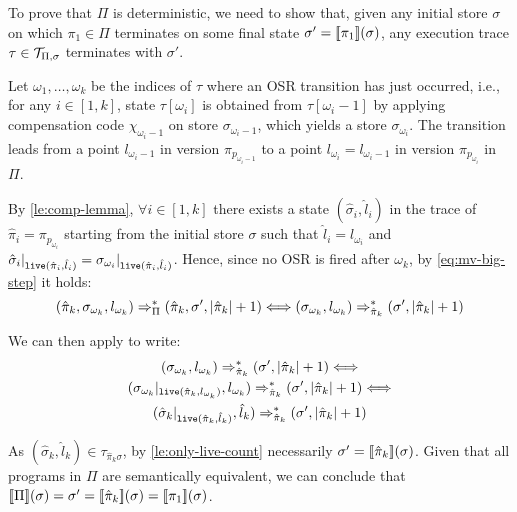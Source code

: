 \begin{myproof}
To prove that $\Pi$ is deterministic, we need to show that, given any initial store $\sigma$ on which $\pi_1\in\Pi$ terminates on some final state $\sigma'=[\![\pi_1]\!](\sigma)$, any execution trace $\tau\in{\cal T}_{\Pi,\sigma}$ terminates with $\sigma'$.

Let $\omega_1,\ldots,\omega_k$ be the indices of $\tau$ where an OSR transition has just occurred, i.e., for any $i\in[1,k]$, state $\tau[\omega_i]$ is obtained from $\tau[\omega_i-1]$ by applying compensation code $\chi_{\omega_i-1}$ on store $\sigma_{\omega_i-1}$, which yields a store $\sigma_{\omega_i}$. The transition leads from a point $l_{\omega_i-1}$ in version $\pi_{p_{\omega_i-1}}$ to a point $l_{\omega_i}=l_{\omega_i-1}$ in version $\pi_{p_{\omega_{i}}}$ in $\Pi$. 

By \mylemma\ref{le:comp-lemma}, $\forall i\in[1,k]$ there exists a state $(\hat{\sigma}_i,\hat{l}_i)$ in the trace of $\hat{\pi}_i=\pi_{p_{\omega_{i}}}$ starting from the initial store $\sigma$ such that $\hat{l}_i=l_{\omega_i}$ and $\hat{\sigma}_i\vert_{\text{${\tt live}$}(\hat{\pi}_i,\hat{l}_i)}=\sigma_{\omega_i}\vert_{\text{${\tt live}$}(\hat{\pi}_i,\hat{l}_i)}$. Hence, since no OSR is fired after $\omega_k$, by \myequation\ref{eq:mv-big-step} it holds: 
\begin{equation*}
(\hat{\pi}_k,\sigma_{\omega_{k}},l_{\omega_{k}})\Rightarrow^*_{\Pi}(\hat{\pi}_k,\sigma',|\hat{\pi}_k|+1) \Longleftrightarrow (\sigma_{\omega_{k}},l_{\omega_{k}})\Rightarrow^*_{\hat{\pi}_k}(\sigma',|\hat{\pi}_k|+1)
\end{equation*}

\noindent We can then apply  to write:
\begin{gather*}
(\sigma_{\omega_{k}},l_{\omega_{k}})\Rightarrow^*_{\hat{\pi}_k}(\sigma',|\hat{\pi}_k|+1) \Longleftrightarrow \\ 
(\sigma_{\omega_{k}}\vert_{\text{${\tt live}$}(\hat{\pi}_k,l_{\omega_{k}})},l_{\omega_{k}})\Rightarrow^*_{\hat{\pi}_k}(\sigma',|\hat{\pi}_k|+1) \Longleftrightarrow \\
(\hat{\sigma}_k\vert_{\text{${\tt live}$}(\hat{\pi}_k,\hat{l}_k)},\hat{l}_k)\Rightarrow^*_{\hat{\pi}_k}(\sigma',|\hat{\pi}_k|+1)
\end{gather*}

\noindent As $(\hat{\sigma}_k,\hat{l}_k)\in\tau_{\hat{\pi}_k\sigma}$, by \ref{le:only-live-count} necessarily $\sigma'=[\![\hat{\pi}_k]\!](\sigma)$. 
Given that all programs in $\Pi$ are semantically equivalent, we can conclude that $[\![\Pi]\!](\sigma)=\sigma'=[\![\hat{\pi}_k]\!](\sigma)=[\![\pi_1]\!](\sigma)$.
\end{myproof}


